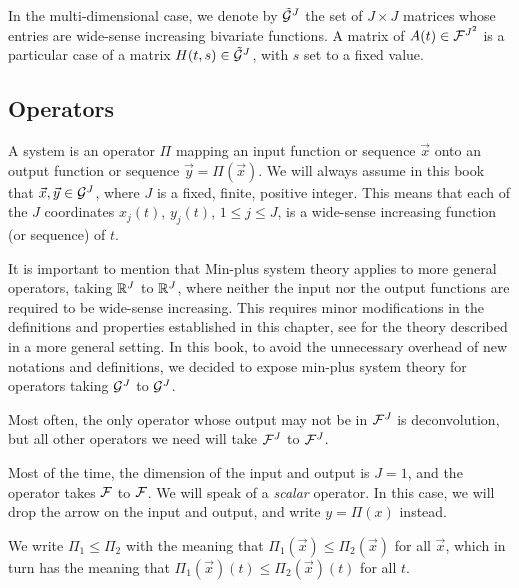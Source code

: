 
In the multi-dimensional case, we denote by  $\tilde{\mathcal G}^J$ the set of $J \times J$ matrices whose entries are wide-sense increasing bivariate functions.
A matrix of $A(t)  \in \mathcal F^{J^2}$ is a particular case of a matrix $H(t,s) \in \tilde{\mathcal G}^J$,
with $s$ set to a fixed value.


\subsection{Operators}


A system is an operator $\Pi$ mapping an
input function or sequence $\vec{x}$ onto an output function or sequence $\vec{y} = \Pi(\vec{x})$. We will always assume in this book that $\vec{x}, \vec{y} \in \mathcal G^{J}$, where $J$ is a  fixed, finite, positive integer. This means that each
of the $J$ coordinates $x_j(t)$, $y_j(t)$, $1 \leq j \leq J$, is a wide-sense increasing function (or sequence) of $t$.

It is important to mention that Min-plus system theory applies  to
more general operators, taking $\mathbb{R}^J$ to $\mathbb{R}^{J}$, where
neither the input nor the output functions are required to be
wide-sense increasing. This requires minor modifications in the
definitions and properties established in this chapter, see
\cite{maxPlus} for the theory described in a more general setting.
In this book, to avoid the unnecessary overhead of new notations
and definitions, we decided to expose min-plus system theory for
operators taking $\mathcal G^J$ to $\mathcal G^J$.

Most often, the only operator whose
output may not be in $\mathcal F^J$ is deconvolution, but all other operators we need will take  $\mathcal F^J$ to $\mathcal F^J$.

Most of the time, the dimension of the input and output is $J =1$, and the operator takes $\mathcal F$ to $\mathcal F$. We will speak of a {\em scalar} operator. In this case, we will drop the arrow on the input and output, and write $y = \Pi(x)$ instead.

We write $\Pi_1 \leq \Pi_2$ with the meaning that $\Pi_1(\vec{x})
\leq \Pi_2(\vec{x})$ for all $\vec{x}$, which in turn has the
meaning that $\Pi_1(\vec{x})(t) \leq \Pi_2(\vec{x})(t)$ for all
$t$.


